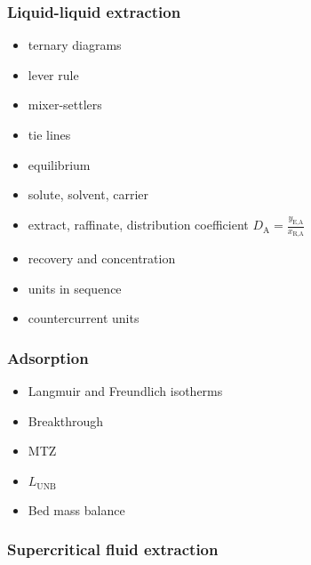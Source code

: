 {
\begin{frame}\frametitle{Liquid-liquid extraction {}}
	{}
	\begin{itemize}
		\item	ternary diagrams
		\item	lever rule
		\item	mixer-settlers
		\item	tie lines
		\item	equilibrium
		\item	solute, solvent, carrier
		\item	extract, raffinate, distribution coefficient $D_\text{A} = \displaystyle \frac{y_\text{E,A}}{x_\text{R,A}}$
		\item	recovery and concentration
		\item	units in sequence
		\item	countercurrent units
	\end{itemize}
\end{frame}}

{
\begin{frame}\frametitle{Adsorption {}}
	\begin{itemize}
		\item	Langmuir and Freundlich isotherms
		\item	Breakthrough
		\item	MTZ
		\item	$L_\text{UNB}$
		\item	Bed mass balance
	\end{itemize}
\end{frame}}

{
\begin{frame}\frametitle{Supercritical fluid extraction {}}
\end{frame}}


